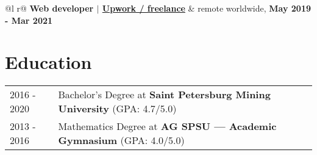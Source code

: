 \documentclass[a4paper,12pt]{article}
\begin{document}
\begin{tabularx}{\linewidth}{ @{}l r@{} }
\textbf{Web developer $|$ \underline{Upwork / freelance}} & \hfill remote worldwide, \textbf{May 2019 - Mar 2021}\\[3.75pt]
\end{tabularx}

\section{Education}
\begin{tabularx}{\linewidth}{@{}l X@{}}	
2016 - 2020 & Bachelor's Degree at \textbf{Saint Petersburg Mining University} \hfill \normalsize (GPA: 4.7/5.0) \\
2013 - 2016 & Mathematics Degree at \textbf{AG SPSU — Academic Gymnasium} \hfill (GPA: 4.0/5.0) \\ 
\end{tabularx}

\vfill
{}
\end{document}
